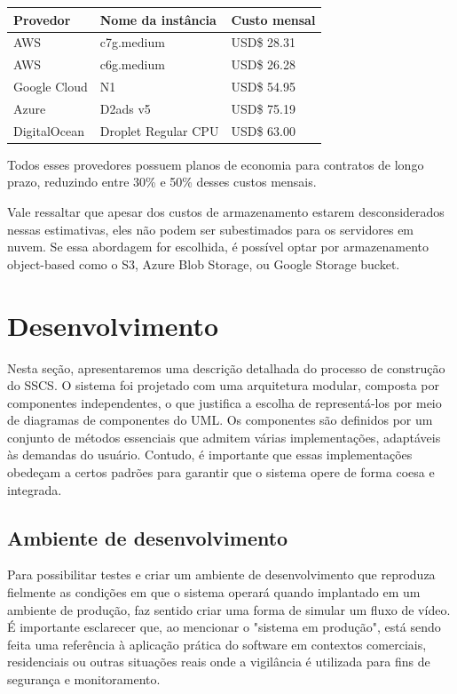 \documentclass[12pt, %
openright, 
oneside, %
a4paper,    %
brazil]{facom-ufu-abntex2}
\begin{document}
\begin{center}
	\begin{tabular}{|l|l|l|}
		\hline
		Provedor     & Nome da instância   & Custo mensal
		\\ \hline
		AWS          & c7g.medium          & USD\$ 28.31
		\\ \hline
		AWS          & c6g.medium          & USD\$ 26.28
		\\ \hline
		Google Cloud & N1                  & USD\$ 54.95
		\\ \hline
		Azure        & D2ads v5            & USD\$ 75.19
		\\ \hline
		DigitalOcean & Droplet Regular CPU & USD\$ 63.00
		\\ \hline

	\end{tabular}
\end{center}

Todos esses provedores possuem planos de economia para contratos de longo
prazo, reduzindo entre 30\% e 50\% desses custos mensais.

Vale ressaltar que apesar dos custos de armazenamento estarem desconsiderados
nessas estimativas, eles não podem ser subestimados para os servidores em
nuvem. Se essa abordagem for escolhida, é possível optar por armazenamento
object-based como o S3, Azure Blob Storage, ou Google Storage bucket.

\chapter{Desenvolvimento}

Nesta seção, apresentaremos uma descrição detalhada do processo de construção
do SSCS. O sistema foi projetado com uma arquitetura modular, composta por
componentes independentes, o que justifica a escolha de representá-los por meio
de diagramas de componentes do UML. Os componentes são definidos por um
conjunto de métodos essenciais que admitem várias implementações, adaptáveis às
demandas do usuário. Contudo, é importante que essas implementações obedeçam a
certos padrões para garantir que o sistema opere de forma coesa e integrada.

\section{Ambiente de desenvolvimento}

Para possibilitar testes e criar um ambiente de desenvolvimento que reproduza
fielmente as condições em que o sistema operará quando implantado em um
ambiente de produção, faz sentido criar uma forma de simular um fluxo de vídeo.
É importante esclarecer que, ao mencionar o "sistema em produção", está sendo
feita uma referência à aplicação prática do software em contextos comerciais,
residenciais ou outras situações reais onde a vigilância é utilizada para fins
de segurança e monitoramento.
\end{document}
